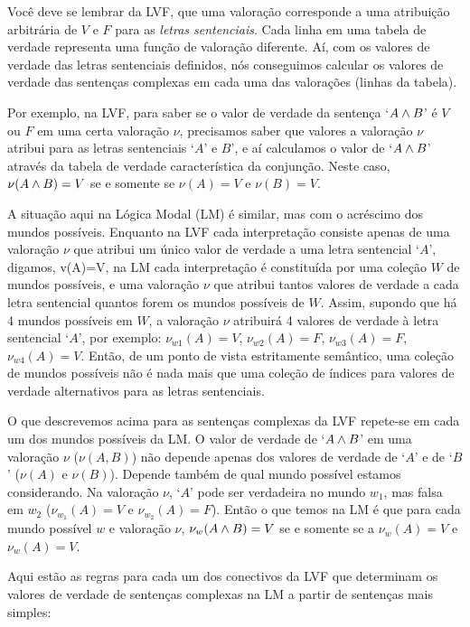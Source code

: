 Você deve se lembrar da LVF, que uma valoração corresponde a uma atribuição arbitrária de $V$ e $F$ para as \emph{letras sentenciais}. Cada linha em uma tabela de verdade representa uma função de valoração diferente. Aí, com os valores de verdade das letras sentenciais definidos, nós conseguimos calcular os valores de verdade das sentenças complexas em cada uma das valorações (linhas da tabela).

Por exemplo, na LVF, para saber se o valor de verdade da sentença `$A\wedge B$' é $V$ ou $F$ em uma certa valoração $\nu$, precisamos saber que valores a valoração $\nu$ atribui para as letras sentenciais `$A$' e $B$', e aí calculamos o valor de `$A\wedge B$' através da tabela de verdade característica da conjunção. Neste caso, $\nu(A\wedge B)=V$ se e somente se $\nu(A)=V$ e $\nu(B)=V$.   

A situação aqui na Lógica Modal (LM) é similar, mas com o acréscimo dos mundos possíveis. 
Enquanto na LVF cada interpretação consiste apenas de uma valoração $\nu$ que atribui um único valor de verdade a uma letra sentencial `$A$', digamos, v(A)=V,   na LM cada interpretação é constituída por uma coleção $W$ de mundos possíveis, e uma valoração $\nu$ que atribui tantos valores de verdade a cada letra sentencial quantos forem os mundos possíveis de $W$. Assim, supondo que há 4 mundos possíveis em $W$, a valoração $\nu$ atribuirá 4 valores de verdade à letra sentencial `$A$', por exemplo: $\nu_{w1}(A)=V$, $\nu_{w2}(A)=F$,  $\nu_{w3}(A)=F$,  $\nu_{w4}(A)=V$. Então, de um ponto de vista estritamente semântico, uma coleção de mundos possíveis não é nada mais que uma coleção de índices para valores de verdade alternativos para as letras sentenciais.

O que descrevemos acima para as sentenças complexas da LVF repete-se em cada um dos mundos possíveis da LM. O valor de verdade de `$A\wedge B$' em uma valoração $\nu$  
 ($\nu (A,B)$)  não depende apenas dos valores de verdade de `$A$' e de `$B$' ($\nu (A)$ e $\nu(B)$). 
Depende também de qual mundo possível estamos considerando. Na valoração $\nu$,  `$A$' pode ser verdadeira no mundo $w_1$, mas falsa em $w_2$
  ($\nu_{w_1}(A)=V$ e $\nu_{w_2}(A)=F$). Então o que temos na LM é que para cada mundo possível $w$ e valoração $\nu$, $\nu_w(A\wedge B) = V$ se e somente se a $\nu_w(A) = V$ e $\nu_w(A) = V$.

Aqui estão as regras para cada um dos conectivos da LVF que determinam os valores de verdade de sentenças complexas na LM a partir de sentenças mais simples:

